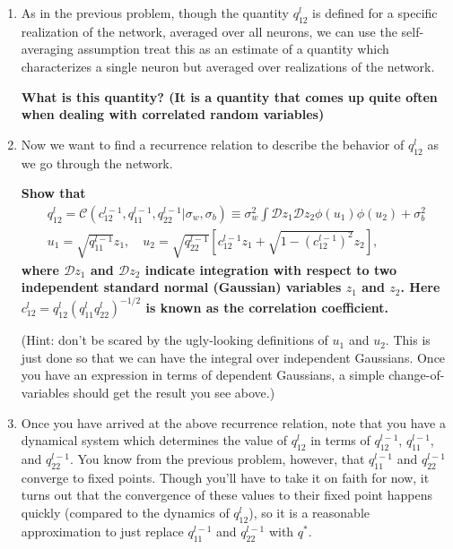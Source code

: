 \documentclass[a4paper]{article}
\begin{document}
\begin{enumerate}[label=(\alph*)]

\item As in the previous problem, though the quantity $q_{12}^l$ is defined for a specific realization of the network, averaged over all neurons, we can use the self-averaging assumption treat this as an estimate of a quantity which characterizes a single neuron but averaged over realizations of the network.  

\textbf{What is this quantity?  (It is a quantity that comes up quite often when dealing with correlated random variables)}

\item Now we want to find a recurrence relation to describe the behavior of $q_{12}^l$ as we go through the network.  

\textbf{Show that}
\begin{align*}{q_{12}^{l}=\mathcal{C}\left(c_{12}^{l-1}, q_{11}^{l-1}, q_{22}^{l-1} | \sigma_{w}, \sigma_{b}\right) \equiv \sigma_{w}^{2} \int \mathcal{D} z_{1} \mathcal{D} z_{2} \phi\left(u_{1}\right) \phi\left(u_{2}\right)+\sigma_{b}^{2}} \\ {u_{1}=\sqrt{q_{11}^{l-1}} z_{1}, \quad u_{2}=\sqrt{q_{22}^{l-1}}\left[c_{12}^{l-1} z_{1}+\sqrt{1-\left(c_{12}^{l-1}\right)^{2}} z_{2}\right]},\end{align*}
\textbf{where $\mathcal{D} z_{1}$ and $\mathcal{D} z_{2}$ indicate integration with respect to two independent standard normal (Gaussian) variables $z_1$ and $z_2$.  Here $c_{12}^l = q_{12}^l (q^l_{11} q^l_{22})^{-1/2}$ is known as the correlation coefficient.}

(Hint: don't be scared by the ugly-looking definitions of $u_1$ and $u_2$.  This is just done so that we can have the integral over independent Gaussians.  Once you have an expression in terms of dependent Gaussians, a simple change-of-variables should get the result you see above.)

\item Once you have arrived at the above recurrence relation, note that you have a dynamical system which determines the value of $q_{12}^l$ in terms of $q_{12}^{l-1}$, $q_{11}^{l-1}$, and $q_{22}^{l-1}$.  You know from the previous problem, however, that $q_{11}^{l-1}$ and $q_{22}^{l-1}$ converge to fixed points.  Though you'll have to take it on faith for now, it turns out that the convergence of these values to their fixed point happens quickly (compared to the dynamics of $q_{12}^l$), so it is a reasonable approximation to just replace $q_{11}^{l-1}$ and $q_{22}^{l-1}$ with $q^*$.


\end{enumerate}
\end{document}

